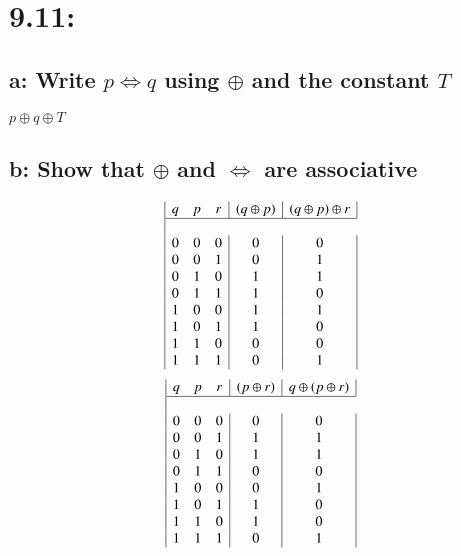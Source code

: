 \documentclass{article}
\begin{document}
\section*{9.11:}
\subsection*{a: Write $p \Leftrightarrow q$ using $\oplus$ and the constant $T$}
$p \oplus q \oplus T$
\subsection*{b: Show that $\oplus$ and $\Leftrightarrow$ are associative}
\begin{displaymath}
  \begin{array}{|c c c|c|c|c|c|}
    q & p & r & (q \oplus p) & (q \oplus p) \oplus r \\
    \hline \\
    0 & 0 & 0 & 0 & 0\\
    0 & 0 & 1 & 0 & 1\\
    0 & 1 & 0 & 1 & 1\\
    0 & 1 & 1 & 1 & 0\\
    1 & 0 & 0 & 1 & 1\\
    1 & 0 & 1 & 1 & 0\\
    1 & 1 & 0 & 0 & 0\\
    1 & 1 & 1 & 0 & 1\\
  \end{array}
\end{displaymath}
\begin{displaymath}
  \begin{array}{|c c c|c|c|c|c|}
    q & p & r & (p \oplus r) & q \oplus (p \oplus r) \\
    \hline \\
    0 & 0 & 0 & 0 & 0\\
    0 & 0 & 1 & 1 & 1\\
    0 & 1 & 0 & 1 & 1\\
    0 & 1 & 1 & 0 & 0\\
    1 & 0 & 0 & 0 & 1\\
    1 & 0 & 1 & 1 & 0\\
    1 & 1 & 0 & 1 & 0\\
    1 & 1 & 1 & 0 & 1\\
  \end{array}
\end{displaymath}
\end{document}
